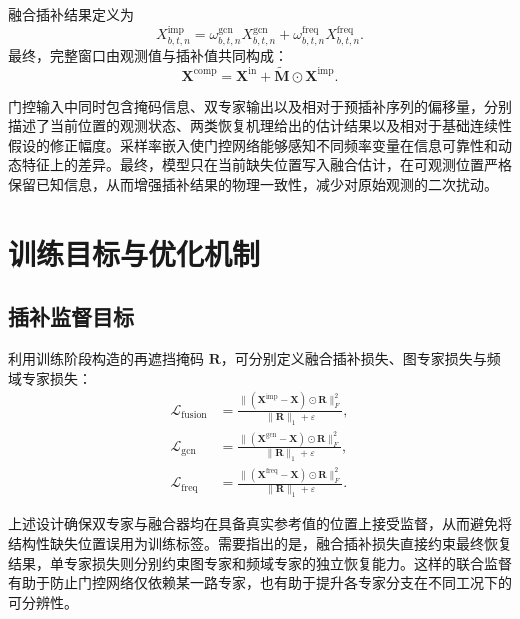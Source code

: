 \documentclass[bachelor, vlined]{DissertUESTC}
\begin{document}
    融合插补结果定义为
    \begin{equation}
        X_{b,t,n}^{\mathrm{imp}}
        =
        \omega_{b,t,n}^{\mathrm{gcn}} X_{b,t,n}^{\mathrm{gcn}}
        +
        \omega_{b,t,n}^{\mathrm{freq}} X_{b,t,n}^{\mathrm{freq}}.
    \end{equation}
    最终，完整窗口由观测值与插补值共同构成：
    \begin{equation}
        \mathbf{X}^{\mathrm{comp}}
        =
        \mathbf{X}^{\mathrm{in}}
        +
        \widetilde{\mathbf{M}} \odot \mathbf{X}^{\mathrm{imp}}.
    \end{equation}

    门控输入中同时包含掩码信息、双专家输出以及相对于预插补序列的偏移量，分别描述了当前位置的观测状态、两类恢复机理给出的估计结果以及相对于基础连续性假设的修正幅度。采样率嵌入使门控网络能够感知不同频率变量在信息可靠性和动态特征上的差异。最终，模型只在当前缺失位置写入融合估计，在可观测位置严格保留已知信息，从而增强插补结果的物理一致性，减少对原始观测的二次扰动。

    \section{训练目标与优化机制}

    \subsection{插补监督目标}

    利用训练阶段构造的再遮挡掩码 $\mathbf{R}$，可分别定义融合插补损失、图专家损失与频域专家损失：
    \begin{align}
        \mathcal{L}_{\mathrm{fusion}}
        &=
        \frac{\|(\mathbf{X}^{\mathrm{imp}}-\mathbf{X}) \odot \mathbf{R}\|_F^2}{\|\mathbf{R}\|_1 + \varepsilon}, \\
        \mathcal{L}_{\mathrm{gcn}}
        &=
        \frac{\|(\mathbf{X}^{\mathrm{gcn}}-\mathbf{X}) \odot \mathbf{R}\|_F^2}{\|\mathbf{R}\|_1 + \varepsilon}, \\
        \mathcal{L}_{\mathrm{freq}}
        &=
        \frac{\|(\mathbf{X}^{\mathrm{freq}}-\mathbf{X}) \odot \mathbf{R}\|_F^2}{\|\mathbf{R}\|_1 + \varepsilon}.
    \end{align}

    上述设计确保双专家与融合器均在具备真实参考值的位置上接受监督，从而避免将结构性缺失位置误用为训练标签。需要指出的是，融合插补损失直接约束最终恢复结果，单专家损失则分别约束图专家和频域专家的独立恢复能力。这样的联合监督有助于防止门控网络仅依赖某一路专家，也有助于提升各专家分支在不同工况下的可分辨性。
\end{document}

